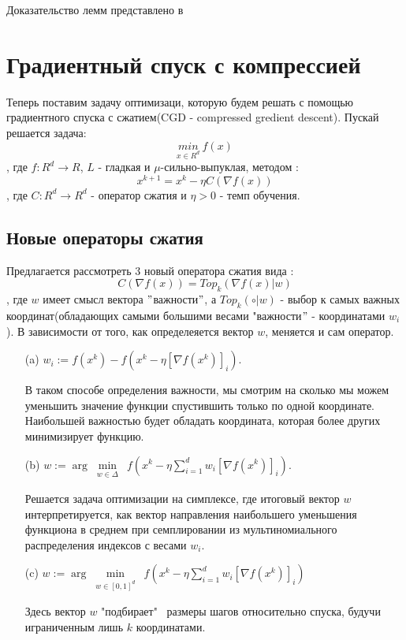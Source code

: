 \documentclass[12pt, twoside]{article}
\begin{document}
Доказательство лемм представлено в \cite{beznosikov2024biasedcompressiondistributedlearning}
\section{Градиентный спуск с компрессией}
Теперь поставим задачу оптимизаци, которую будем решать с помощью градиентного спуска с сжатием(CGD - compressed gredient descent). Пускай решается задача:
\begin{equation}
    \label{unconstrayed_problem}
    \underset{x\in R^d}{min} \ f(x)
\end{equation}, где $f : R^d \rightarrow R$, $L$ - гладкая и $\mu$-сильно-выпуклая, методом :
\begin{equation}
    \label{CGD}
    x^{k+1} = x^k - \eta C(\nabla f(x))
\end{equation}, где $C : R^d \rightarrow R^d$ - оператор сжатия и $\eta > 0$ - темп обучения.

\subsection{Новые операторы сжатия}
Предлагается рассмотреть 3 новый оператора сжатия вида :
\begin{equation}
\label{new_compressors}
C(\nabla f(x)) = Top_k(\nabla f(x) | w) 
\end{equation}, 
где $w$ имеет смысл вектора $"$важности$"$, а $Top_k(\circ | w)$ - выбор $к$ самых важных координат(обладающих самыми большими весами "важности$"$ - координатами $w_i$). В зависимости от того, как определеяется вектор $w$, меняется и сам оператор.

\begin{enumerate}
    \item[(a)]  $w_i := f \left(x^k \right) - f \left(x^k - \eta \left[ \nabla f(x^k) \right]_i \right)$.\label{a} 
    
    В таком способе определения важности, мы смотрим на сколько мы можем уменьшить значение функции спустившить только по одной координате. Наибольшей важностью будет обладать координата, которая более других минимизирует функцию.
    \item[(b)]  $w := \arg\underset{\substack{w \in \Delta}}{\min} \  f \left(x^k - \eta \sum_{i=1}^d w_i \left[ \nabla f(x^k) \right]_i \right)$.\label{b} 
    
    Решается задача оптимизации на симплексе, где итоговый вектор $w$ интерпретируется, как вектор направления наибольшего уменьшения функциона в среднем при семплировании из мультиномиального распределения индексов с весами $w_i$.
    \item[(c)]  $w := \arg\underset{\substack{w \in [0, 1]^d}}{\min} \  f \left(x^k - \eta \sum_{i=1}^d w_i \left[ \nabla f(x^k) \right]_i \right)$\label{c}

    Здесь вектор $w$ "подбирает" \ размеры шагов относительно спуска, будучи играниченным лишь $k$ координатами. 
\end{enumerate}
\end{document}
